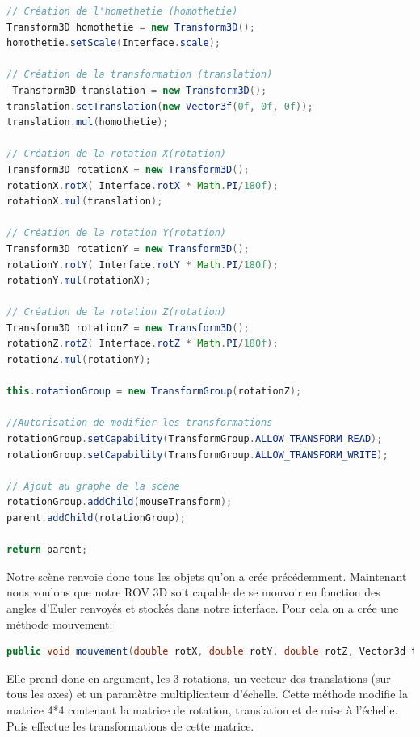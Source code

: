 \documentclass[a4paper,11pt]{report}
\begin{document}
		\begin{lstlisting}[language=java]
// Création de l'homethetie (homothetie)
Transform3D homothetie = new Transform3D();
homothetie.setScale(Interface.scale); 
    
// Création de la transformation (translation)
 Transform3D translation = new Transform3D();
translation.setTranslation(new Vector3f(0f, 0f, 0f));
translation.mul(homothetie);
    
// Création de la rotation X(rotation)
Transform3D rotationX = new Transform3D();
rotationX.rotX( Interface.rotX * Math.PI/180f);
rotationX.mul(translation);
    
// Création de la rotation Y(rotation)
Transform3D rotationY = new Transform3D();
rotationY.rotY( Interface.rotY * Math.PI/180f);
rotationY.mul(rotationX);
    
// Création de la rotation Z(rotation)
Transform3D rotationZ = new Transform3D();
rotationZ.rotZ( Interface.rotZ * Math.PI/180f);
rotationZ.mul(rotationY);
    
this.rotationGroup = new TransformGroup(rotationZ);

//Autorisation de modifier les transformations
rotationGroup.setCapability(TransformGroup.ALLOW_TRANSFORM_READ);
rotationGroup.setCapability(TransformGroup.ALLOW_TRANSFORM_WRITE);
    
// Ajout au graphe de la scène
rotationGroup.addChild(mouseTransform);
parent.addChild(rotationGroup);

return parent;
		\end{lstlisting}
		Notre scène renvoie donc tous les objets qu'on a crée précédemment.
		\newline \newline Maintenant nous voulons que notre ROV 3D soit capable de se mouvoir en fonction des angles d’Euler renvoyés et stockés dans notre interface.
		\newline Pour cela on a crée une méthode mouvement:
		\begin{lstlisting}[language=java]
public void mouvement(double rotX, double rotY, double rotZ, Vector3d trans, double scale)
		\end{lstlisting}
		Elle prend donc en argument, les 3 rotations, un vecteur des translations (sur tous les axes) et un paramètre multiplicateur d’échelle.
		\newline Cette méthode modifie la matrice 4*4 contenant la matrice de rotation, translation et de mise à l’échelle.
		\newline Puis effectue les transformations de cette matrice.
		
\end{document}
